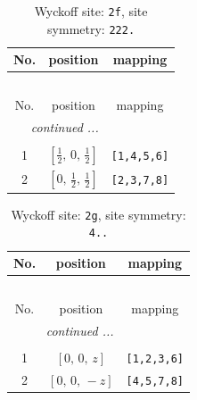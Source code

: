 \documentclass[fleqn,8pt]{jsarticle}
\begin{document}
\renewcommand{\arraystretch}{1.2}
\begin{longtable}{ccc}
\caption{Wyckoff site: {\tt 2f}, site symmetry: {\tt 222.}}
 \\
 \hline \hline
No. & position & mapping \\ \hline \endfirsthead

\multicolumn{2}{l}{\tablename\ \thetable{}} \\
 \hline \hline
No. & position & mapping \\ \hline \endhead

 \hline \hline
\multicolumn{2}{r}{\footnotesize\it continued ...} \\ \endfoot

 \hline \hline
\multicolumn{2}{r}{} \\ \endlastfoot

1 & $\left[ \frac{1}{2},\, 0,\, \frac{1}{2} \right]$ & {\tt [1,4,5,6]} \\ \hline
2 & $\left[ 0,\, \frac{1}{2},\, \frac{1}{2} \right]$ & {\tt [2,3,7,8]} \\
\end{longtable}
\renewcommand{\arraystretch}{1.2}
\begin{longtable}{ccc}
\caption{Wyckoff site: {\tt 2g}, site symmetry: {\tt 4..}}
 \\
 \hline \hline
No. & position & mapping \\ \hline \endfirsthead

\multicolumn{2}{l}{\tablename\ \thetable{}} \\
 \hline \hline
No. & position & mapping \\ \hline \endhead

 \hline \hline
\multicolumn{2}{r}{\footnotesize\it continued ...} \\ \endfoot

 \hline \hline
\multicolumn{2}{r}{} \\ \endlastfoot

1 & $\left[ 0,\, 0,\, z \right]$ & {\tt [1,2,3,6]} \\ \hline
2 & $\left[ 0,\, 0,\, - z \right]$ & {\tt [4,5,7,8]} \\
\end{longtable}
\renewcommand{\arraystretch}{1.2}
\end{document}
